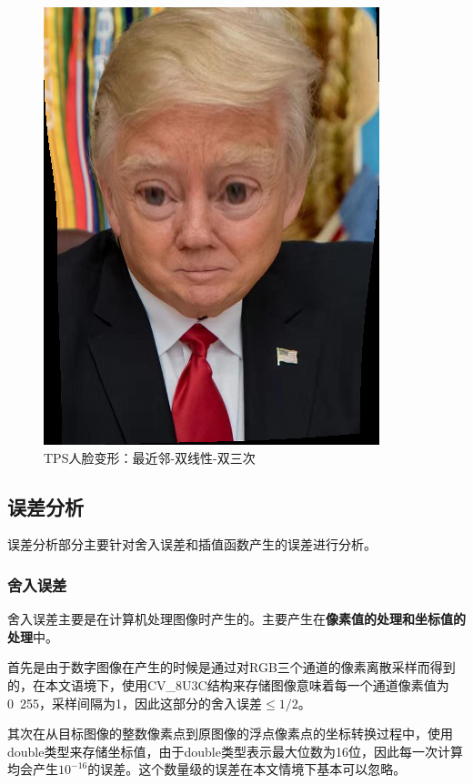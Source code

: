 \documentclass[UTF8]{ctexart}
\begin{document}
\begin{figure}[H]
    \includegraphics[scale=0.28]{images/report-images/8to6bicub.png}
    \caption{TPS人脸变形：最近邻-双线性-双三次}
\end{figure}


\subsection{误差分析}
误差分析部分主要针对舍入误差和插值函数产生的误差进行分析。
\subsubsection{舍入误差}
舍入误差主要是在计算机处理图像时产生的。主要产生在\textbf{像素值的处理和坐标值的处理}中。

首先是由于数字图像在产生的时候是通过对RGB三个通道的像素离散采样而得到的，在本文语境下，使用CV\_8U3C结构来存储图像意味着每一个通道像素值为0~255，采样间隔为1，因此这部分的舍入误差$\leq 1/2$。

其次在从目标图像的整数像素点到原图像的浮点像素点的坐标转换过程中，使用double类型来存储坐标值，由于double类型表示最大位数为16位，因此每一次计算均会产生$10^{-16}$的误差。这个数量级的误差在本文情境下基本可以忽略。
\end{document}
